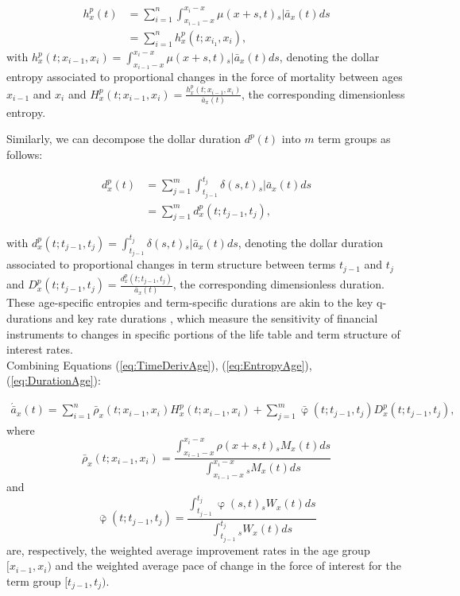 \documentclass[12pt]{article}
\begin{document}
\begin{equation} \label{eq:EntropyAge}
\begin{split}
{h}^{p}_{x}(t) &=  \sum_{i=1}^n\int_{x_{i-1}-x}^{x_i-x} \mu(x+s,t)   {}_s|\bar{a}_x(t) ds \\
&=  \sum_{i=1}^n {h}^{p}_{x}(t;x_{i_1},x_{i}),
\end{split}
\end{equation}
with ${h}^{p}_{x}(t;x_{i-1},x_{i})=\int_{x_{i-1}-x}^{x_i-x} \mu(x+s,t)   {}_s|\bar{a}_x(t) ds$, denoting the dollar entropy associated to proportional changes in the force of mortality between ages $x_{i-1}$ and $x_{i}$ and ${H}^{p}_{x}(t;x_{i-1},x_{i}) = \frac{{h}^{p}_{x}(t;x_{i-1},x_{i})}{\bar{a}_x(t)}$, the corresponding dimensionless entropy. 

Similarly, we can decompose the dollar duration $d^p(t)$ into $m$ term groups as follows:

\begin{equation}\label{eq:DurationAge}
\begin{split}
{d}^{p}_{x}(t) &= \sum_{j=1}^m\int_{t_{j-1}}^{t_j} \delta(s,t) {}_s|\bar{a}_x(t)ds \\
&= \sum_{j=1}^m {d}^{p}_{x}(t;t_{j-1},t_{j}),
\end{split}
\end{equation}

with ${d}^{p}_{x}(t;t_{j-1},t_{j}) = \int_{t_{j-1}}^{t_j} \delta(s,t) {}_s|\bar{a}_x(t)ds$, denoting the dollar duration associated to proportional changes in term structure between terms $t_{j-1}$ and $t_{j}$ and ${D}^{p}_{x}(t;t_{j-1},t_{j}) = \frac{{d}^{p}_{x}(t;t_{j-1},t_{j})}{\bar{a}_x(t)}$, the corresponding dimensionless duration. These age-specific entropies and term-specific durations are akin to the key q-durations \citep{li2012key} and key rate durations \citep{Ho1992}, which measure the sensitivity of financial instruments to changes in specific portions of the life table and term structure of interest rates.\\

Combining Equations (\ref{eq:TimeDerivAge}), (\ref{eq:EntropyAge}), (\ref{eq:DurationAge}):  

\begin{equation}\label{eq:TimeDerivAge2}
\begin{split}
 \acute{\bar{a}}_x(t) = \sum_{i=1}^n\bar{\rho}_x(t;x_{i-1}, x_i){H}^{p}_x(t;x_{i-1}, x_i) +\sum_{j=1}^m\bar{\upvarphi}(t;t_{j-1},t_{j}){D}^{p}_x(t;t_{j-1},t_{j}),  
\end{split}
\end{equation}
where $$\bar{\rho}_x(t;x_{i-1}, x_i)= \frac{\int_{x_{i-1}-x}^{x_i-x} \rho(x+s,t) {}_sM_x(t)  ds}{\int_{x_{i-1}-x}^{x_i-x}  {}_sM_x(t)ds}$$ and 
$$\bar{\upvarphi}(t;t_{j-1},t_{j})= \frac{\int_{t_{j-1}}^{t_{j}} \upvarphi(s,t) {}_sW_x(t)  ds}{\int_{t_{j-1}}^{t_{j}} {}_sW_x(t) ds}$$ are, respectively, the weighted average improvement rates in the age group $[x_{i-1},x_{i})$ and the weighted average pace of change in the force of interest for the term group $[t_{j-1},t_{j})$. 
\end{document}
